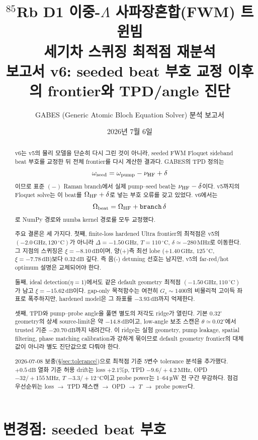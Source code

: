\documentclass[11pt,a4paper]{article}
\title{\textbf{$^{85}$Rb D1 이중-$\Lambda$ 사파장혼합(FWM) 트윈빔\\
세기차 스퀴징 최적점 재분석}\\[3pt]
\large 보고서 v6: seeded beat 부호 교정 이후의 frontier와 TPD/angle 진단}
\author{GABES (Generic Atomic Bloch Equation Solver) 분석 보고서}
\date{2026년 7월 6일}
\newcommand{\dB}{\,\mathrm{dB}}
\newcommand{\GHz}{\,\mathrm{GHz}}
\newcommand{\MHz}{\,\mathrm{MHz}}
\newcommand{\degC}{\,^{\circ}\mathrm{C}}
\begin{document}
\maketitle

\begin{abstract}
\noindent
v6는 v5의 물리 모델을 단순히 다시 그린 것이 아니라, seeded FWM Floquet
sideband beat 부호를 교정한 뒤 전체 frontier를 다시 계산한 결과다.
GABES의 TPD 정의는
\[
  \omega_{\rm seed}=\omega_{\rm pump}-\nu_{\rm HF}+\delta
\]
이므로 표준 $(-)$ Raman branch에서 실제 pump--seed beat는
$\nu_{\rm HF}-\delta$이다. v5까지의 Floquet solve는 이 beat를
$\Omega_{\rm HF}+\delta$로 넣는 부호 오류를 갖고 있었다. v6에서는
\[
  \Omega_{\rm beat}=\Omega_{\rm HF}+{\tt branch}\,\delta
\]
로 NumPy 경로와 numba kernel 경로를 모두 교정했다.

주요 결론은 세 가지다. 첫째, finite-loss hardened Ultra frontier의 최적점은
v5의 $(-2.0\GHz,120\degC)$가 아니라
$\Delta=-1.50\GHz$, $T=110\degC$, $\delta\simeq-280\MHz$로 이동한다.
그 지점의 스퀴징은 $\xi=-8.10\dB$이며, 양(+)측 최선 lobe
($+1.40\GHz$, $125\degC$, $\xi=-7.78\dB$)보다 $0.32\dB$ 깊다.
즉 음(-) detuning 선호는 남지만, v5의 far-red/hot optimum 설명은 교체되어야 한다.

둘째, ideal detection($\eta=1$)에서도 같은 default geometry 최적점
$(-1.50\GHz,110\degC)$가 남고 $\xi=-15.62\dB$이다. gap-only 목적함수는
여전히 $G_s\sim 1400$의 비물리적 고이득 좌표로 폭주하지만, hardened model은
그 좌표를 $-3.93\dB$까지 억제한다.

셋째, TPD와 pump--probe angle을 풀면 별도의 저각도 ridge가 열린다.
기본 $0.32^\circ$ geometry의 상세 source-limit은 약 $-14.8\dB$이고,
low-angle 보조 스캔은 $\theta\simeq0.02^\circ$에서 trusted 기준
$-20.70\dB$까지 내려간다. 이 ridge는 실험 geometry, pump leakage,
spatial filtering, phase matching calibration과 강하게 묶이므로 default
geometry frontier의 대체값이 아니라 별도 진단값으로 다뤄야 한다.

2026-07-08 보충(\S\ref{sec:tolerance})으로 최적점 기준 5변수 tolerance
분석을 추가했다. $+0.5\dB$ 열화 기준 허용 drift는 loss $+2.1\%$p,
TPD $-9.6/+4.2\MHz$, OPD $-32/+155\MHz$, $T$ $-3.3/+12\degC$이고 probe
power는 1--64\,µW 전 구간 무감하다. 점검 우선순위는
loss $\to$ TPD 재스캔 $\to$ OPD $\to$ $T$ $\to$ probe power다.
\end{abstract}

\section{변경점: seeded beat 부호}
\end{document}
